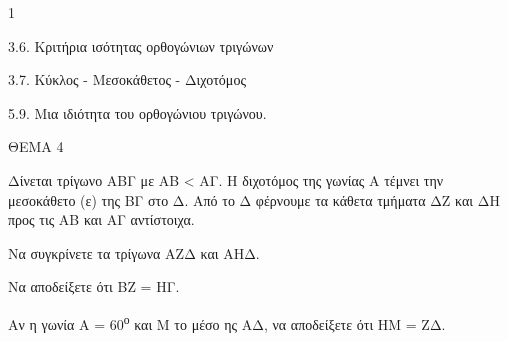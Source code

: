 \begin{ylh}{1}
    \item 3.6. Κριτήρια ισότητας ορθογώνιων τριγώνων
    \item 3.7. Κύκλος - Μεσοκάθετος - Διχοτόμος
    \item 5.9. Μια ιδιότητα του ορθογώνιου τριγώνου.
\end{ylh}

ΘΕΜΑ 4

Δίνεται τρίγωνο ΑΒΓ με ΑΒ \textless{} ΑΓ. Η διχοτόμος της γωνίας Α τέμνει την μεσοκάθετο (ε) της ΒΓ στο Δ. Από το Δ φέρνουμε τα κάθετα τμήματα ΔΖ και ΔΗ προς τις ΑΒ και ΑΓ αντίστοιχα.

\begin{alist}
\item Να συγκρίνετε τα τρίγωνα ΑΖΔ και ΑΗΔ. 

\item Να αποδείξετε ότι ΒΖ = ΗΓ. 

\item Αν η γωνία Α = 60\textsuperscript{ο} και Μ το μέσο ης ΑΔ, να αποδείξετε ότι ΗΜ = ΖΔ.



\begin{center}
\end{center}
\end{alist}
